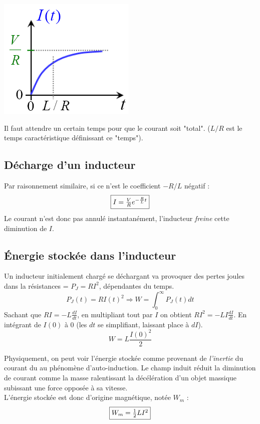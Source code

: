 \documentclass	[11pt, a4paper, openany]{book}
\begin{document}
\begin{center}
\includegraphics[scale=0.50]{em/image23.png}\\
\end{center}
Il faut attendre un certain temps pour que le courant soit "total". ($L/R$ est le temps caractéristique  définissant ce "temps").

\subsection{Décharge d'un inducteur}
Par raisonnement similaire, si ce n'est le coefficient $-R/L$ négatif : 
\begin{equation}
\fbox{$ I = \frac{V}{R}e^{-\frac{R}{L}t}$}
\end{equation}
Le courant n'est donc pas annulé instantanément, l'inducteur \textit{freine} cette diminution de $I$.

\subsection{Énergie stockée dans l'inducteur}
Un inducteur initialement chargé se déchargant va provoquer des pertes joules dans la résistances = $P_J = RI^2$, dépendantes du temps.
\begin{equation}
P_J(t) = RI(t)^2 \Rightarrow W = \int_0^\infty P_J(t) dt
\end{equation}
Sachant que $RI = -L\frac{dI}{dt}$, en multipliant tout par $I$ on obtient $RI^2 = -LI\frac{dI}{dt}$. En intégrant de $I(0)$ à $0$ (les $dt$ se simplifiant, laissant place à $dI$).
\begin{equation}
W = L\frac{I(0)^2}{2}
\end{equation}

Physiquement, on peut voir l'énergie stockée comme provenant de \textit{l'inertie} du courant du au phénomène d'auto-induction. Le champ induit réduit la diminution de courant comme la masse ralentissant la décélération d'un objet massique subissant une force opposée à sa vitesse.\\
L'énergie stockée est donc d'origine magnétique, notée $W_m$ :
\begin{equation}
\fbox{$W_m = \frac{1}{2}LI^2 $}
\end{equation}
\end{document}
